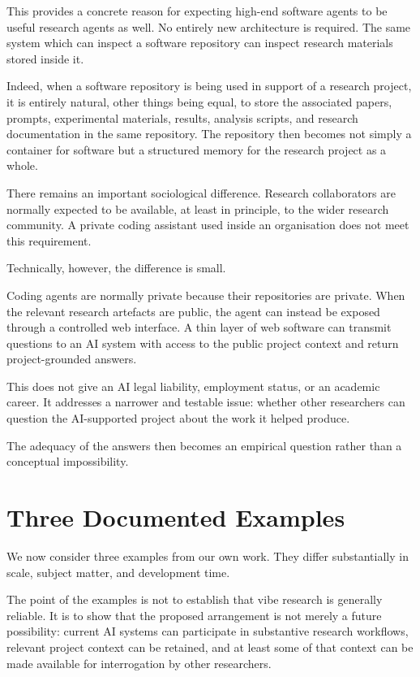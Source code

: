 This provides a concrete reason for expecting high-end software agents to be useful research agents as well. No entirely new architecture is required. The same system which can inspect a software repository can inspect research materials stored inside it.

Indeed, when a software repository is being used in support of a research project, it is entirely natural, other things being equal, to store the associated papers, prompts, experimental materials, results, analysis scripts, and research documentation in the same repository. The repository then becomes not simply a container for software but a structured memory for the research project as a whole.

There remains an important sociological difference. Research collaborators are normally expected to be available, at least in principle, to the wider research community. A private coding assistant used inside an organisation does not meet this requirement.

Technically, however, the difference is small.

Coding agents are normally private because their repositories are private. When the relevant research artefacts are public, the agent can instead be exposed through a controlled web interface. A thin layer of web software can transmit questions to an AI system with access to the public project context and return project-grounded answers.

This does not give an AI legal liability, employment status, or an academic career. It addresses a narrower and testable issue: whether other researchers can question the AI-supported project about the work it helped produce.

The adequacy of the answers then becomes an empirical question rather than a conceptual impossibility.


\section{Three Documented Examples}

We now consider three examples from our own work. They differ substantially in scale, subject matter, and development time.

The point of the examples is not to establish that vibe research is generally reliable. It is to show that the proposed arrangement is not merely a future possibility: current AI systems can participate in substantive research workflows, relevant project context can be retained, and at least some of that context can be made available for interrogation by other researchers.


